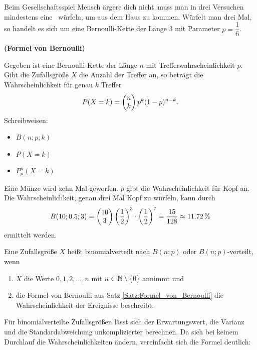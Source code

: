 \documentclass[ngerman, 12pt]{nssheetxea}
\begin{document}
\begin{example}
Beim Gesellschaftsspiel \glqq Mensch ärgere dich nicht\grqq \ muss man in drei Versuchen mindestens eine \grqq \ würfeln, um aus dem Haus zu kommen. Würfelt man drei Mal, so handelt es sich um eine Bernoulli-Kette der Länge 3 mit Parameter $p=\dfrac{1}{6}$.
\end{example}

\begin{theorem} \textbf{(Formel von Bernoulli)} \par
Gegeben ist eine Bernoulli-Kette der Länge $n$ mit Trefferwahrscheinlichkeit $p$. Gibt die Zufallsgröße $X$ die Anzahl der Treffer an, so beträgt die Wahrscheinlichkeit für genau $k$ Treffer
\[ P(X=k) = \colvec{n}{k} p^k (1-p)^{n-k}.  \]
Schreibweisen:
\begin{itemize}
\item $B(n;p;k)$
\item $P(X=k)$
\item $P^n_p(X=k)$
\end{itemize}
\label{Satz:Formel_von_Bernoulli}
\end{theorem}

\begin{example}
Eine Münze wird zehn Mal geworfen. $p$ gibt die Wahrscheinlichkeit für Kopf an. Die Wahrscheinlichkeit, genau drei Mal Kopf zu würfeln, kann durch
\[ B(10;\num{0,5};3)=\colvec{10}{3} \mleft( \dfrac{1}{2} \mright)^3 \cdot \mleft( \dfrac{1}{2} \mright)^7 = \dfrac{15}{128} \approx \SI{11,72}{\percent} \]
ermittelt werden. 
\end{example}

\begin{definition}
Eine Zufallsgröße $X$ heißt binomialverteilt nach $B(n;p)$ oder $B(n;p)$-verteilt, wenn 
\begin{enumerate}
\item $X$ die Werte $0,1,2,\ldots,n$ mit $n\in \mathbb{N} \setminus \{ 0 \}$ annimmt und
\item die Formel von Bernoulli aus Satz \ref{Satz:Formel_von_Bernoulli} die Wahrscheinlichkeit der Ereignisse beschreibt.
\end{enumerate}
\end{definition}

Für binomialverteilte Zufallsgrößen lässt sich der Erwartungswert, die Varianz und die Standardabweichung unkomplizierter berechnen. Da sich bei keinem Durchlauf die Wahrscheinlichkeiten ändern, vereinfacht sich die Formel deutlich:
\end{document}

